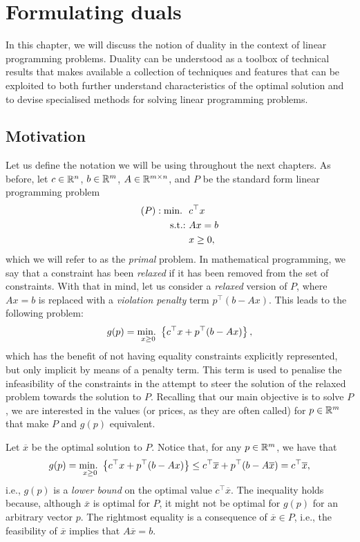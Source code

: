 \section{Formulating duals}

In this chapter, we will discuss the notion of duality in the context of linear programming problems. Duality can be understood as a toolbox of technical results that makes available a collection of techniques and features that can be exploited to both further understand characteristics of the optimal solution and to devise specialised methods for solving linear programming problems.


\subsection{Motivation}

Let us define the notation we will be using throughout the next chapters. As before, let $c \in \mathbb{R}^n$, $b \in \mathbb{R}^m$, $A \in \mathbb{R}^{m \times n}$, and $P$ be the standard form linear programming problem
%
\begin{align*}
	(P) : \mathop{\text{min.~}} \ & c^\top x \\
	\mathop{\text{s.t.:~}} 	  & Ax = b \\
		  & x \geq 0,   
\end{align*}
%
which we will refer to as the \emph{primal} problem. In mathematical programming, we say that a constraint has been \emph{relaxed} if it has been removed from the set of constraints. With that in mind, let us consider a \emph{relaxed} version of $P$, where $Ax = b$ is replaced with a \emph{violation penalty} term $p^\top (b - Ax)$. This leads to the following problem:
%
\begin{equation*}
	g(p) = \mathop{\text{min.~}}_{x \geq 0} \left\{ c^\top x + p^\top (b - Ax) \right \},
\end{equation*}
%
which has the benefit of not having equality constraints explicitly represented, but only implicit by means of a penalty term. This term is used to penalise the infeasibility of the constraints in the attempt to steer the solution of the relaxed problem towards the solution to $P$. Recalling that our main objective is to solve $P$, we are interested in the values (or prices, as they are often called) for $p \in \mathbb{R}^m$ that make $P$ and $g(p)$ equivalent.

Let $\overline{x}$ be the optimal solution to $P$. Notice that, for any $p \in \mathbb{R}^m$, we have that
%
\begin{equation*}
	g(p) = \mathop{\text{min.~}}_{x \geq 0} \left\{ c^\top x + p^\top (b - Ax) \right \} \leq c^\top \overline{x} +  p^\top (b - A\overline{x}) = c^\top \overline{x},   
\end{equation*}
%
i.e., $g(p)$ is a \emph{lower bound} on the optimal value $c^\top \overline{x}$. The inequality holds because, although $\overline{x}$ is optimal for $P$, it might not be optimal for $g(p)$ for an arbitrary vector $p$. The rightmost equality is a consequence of $\overline{x} \in P$, i.e., the feasibility of $\overline{x}$ implies that $A\overline{x} = b$.

